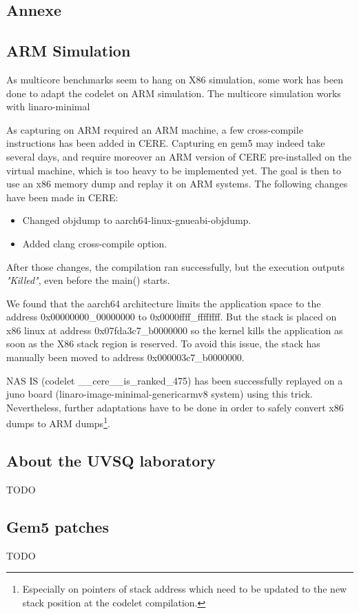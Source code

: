 \documentclass{article}
\begin{document}
\begin{multicols}{2}
\newpage





\newpage
\section{Annexe}
\subsection{ARM Simulation}
\label{ARM_sim}
As multicore benchmarks seem to hang on X86 simulation, some work has been done to adapt the codelet on ARM simulation.
The multicore simulation works with linaro-minimal

As capturing on ARM required an ARM machine, a few cross-compile instructions has been added in CERE. Capturing en gem5 may indeed take several days, and require moreover an ARM version of CERE pre-installed on the virtual machine, which is too heavy to be implemented yet. The goal is then to use an x86 memory dump and replay it on ARM systems. The following changes have been made in CERE:
\begin{itemize}
\item Changed objdump to aarch64-linux-gnueabi-objdump.
\item Added clang cross-compile option.
\end{itemize}

After those changes, the compilation ran successfully, but the execution outputs \textit{"Killed"}, even before the main() starts.


We found that the aarch64 architecture limits the application space to the address 0x00000000\_00000000 to 0x0000ffff\_ffffffff\cite{aarch64-mmu}.
 But the stack is placed on x86 linux at address 0x07fda3c7\_b0000000 so the kernel kills the application as soon as the X86 stack region is reserved.
To avoid this issue, the stack has manually been moved to address 0x000003c7\_b0000000.

NAS IS (codelet \_\_cere\_\_is\_ranked\_475) has been successfully replayed on a juno board (linaro-image-minimal-genericarmv8 system) using this trick. Nevertheless, further adaptations have to be done in order to safely convert x86 dumps to ARM dumps\footnote{Especially on pointers of stack address which need to be updated to the new stack position at the codelet compilation.}.


\subsection{About the UVSQ laboratory}
TODO

\subsection{Gem5 patches}
TODO

\end{multicols}
\end{document}
